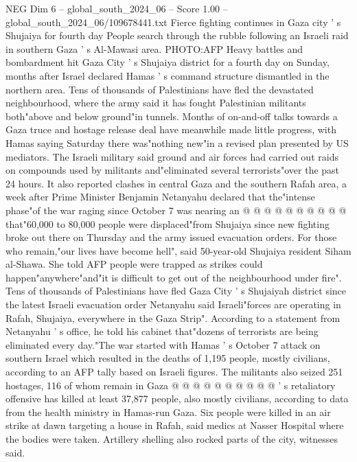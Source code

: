 \begin{textsample}{NEG Dim 6 – global\_south\_2024\_06 – Score 1.00 – global\_south\_2024\_06/109678441.txt}  \label{ex:f6_neg_266}
Fierce fighting continues in Gaza city ' s Shujaiya for fourth day People search through the rubble following an Israeli raid in southern Gaza ' s Al-Mawasi area.
PHOTO:AFP Heavy battles and bombardment hit Gaza City ' s Shujaiya district for a fourth day on Sunday, months after Israel declared Hamas ' s command structure dismantled in the northern area.
Tens of thousands of Palestinians have fled the devastated neighbourhood, where the army said it has fought Palestinian militants both"above and below ground"in tunnels.
Months of on-and-off talks towards a Gaza truce and hostage release deal have meanwhile made little progress, with Hamas saying Saturday there was"nothing new"in a revised plan presented by US mediators.
The Israeli military said ground and air forces had carried out raids on compounds used by militants and"eliminated several terrorists"over the past 24 hours.
It also reported clashes in central Gaza and the southern Rafah area, a week after Prime Minister Benjamin Netanyahu declared that the"intense phase"of the war raging since October 7 was nearing an @ @ @ @ @ @ @ @ @ @ that"60,000 to 80,000 people were displaced"from Shujaiya since new fighting broke out there on Thursday and the army issued evacuation orders.
For those who remain,"our lives have become hell", said 50-year-old Shujaiya resident Siham al-Shawa.
She told AFP people were trapped as strikes could happen"anywhere"and"it is difficult to get out of the neighbourhood under fire".
Tens of thousands of Palestinians have fled Gaza City ' s Shujaiyah district since the latest Israeli evacuation order Netanyahu said Israeli"forces are operating in Rafah, Shujaiya, everywhere in the Gaza Strip".
According to a statement from Netanyahu ' s office, he told his cabinet that"dozens of terrorists are being eliminated every day."The war started with Hamas ' s October 7 attack on southern Israel which resulted in the deaths of 1,195 people, mostly civilians, according to an AFP tally based on Israeli figures.
The militants also seized 251 hostages, 116 of whom remain in Gaza @ @ @ @ @ @ @ @ @ @ ' s retaliatory offensive has killed at least 37,877 people, also mostly civilians, according to data from the health ministry in Hamas-run Gaza.
Six people were killed in an air strike at dawn targeting a house in Rafah, said medics at Nasser Hospital where the bodies were taken.
Artillery shelling also rocked parts of the city, witnesses said.

\end{textsample}
